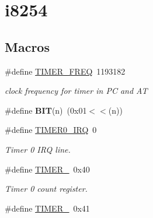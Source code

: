 \hypertarget{group__i8254}{\section{i8254}
\label{group__i8254}
}
\subsection*{Macros}
\begin{DoxyCompactItemize}
\item 
\hypertarget{group__i8254_gacf926951944b6cf370b7229ebd50dd8b}{\#define \hyperlink{group__i8254_gacf926951944b6cf370b7229ebd50dd8b}{T\-I\-M\-E\-R\-\_\-\-F\-R\-E\-Q}~1193182}\label{group__i8254_gacf926951944b6cf370b7229ebd50dd8b}

\begin{DoxyCompactList}\small\item\em clock frequency for timer in P\-C and A\-T \end{DoxyCompactList}\item 
\hypertarget{group__i8254_ga3a8ea58898cb58fc96013383d39f482c}{\#define {\bfseries B\-I\-T}(n)~(0x01$<$$<$(n))}\label{group__i8254_ga3a8ea58898cb58fc96013383d39f482c}

\item 
\hypertarget{group__i8254_ga30bf84c312af248cb81bb224e09f9ba8}{\#define \hyperlink{group__i8254_ga30bf84c312af248cb81bb224e09f9ba8}{T\-I\-M\-E\-R0\-\_\-\-I\-R\-Q}~0}\label{group__i8254_ga30bf84c312af248cb81bb224e09f9ba8}

\begin{DoxyCompactList}\small\item\em Timer 0 I\-R\-Q line. \end{DoxyCompactList}\item 
\hypertarget{group__i8254_gacc9ff9df4a9674a1ce9ba08fc4a4679e}{\#define \hyperlink{group__i8254_gacc9ff9df4a9674a1ce9ba08fc4a4679e}{T\-I\-M\-E\-R\-\_}~0x40}\label{group__i8254_gacc9ff9df4a9674a1ce9ba08fc4a4679e}

\begin{DoxyCompactList}\small\item\em Timer 0 count register. \end{DoxyCompactList}\item 
\hypertarget{group__i8254_gac62c99c2a9289891c1b83052242cca49}{\#define \hyperlink{group__i8254_gac62c99c2a9289891c1b83052242cca49}{T\-I\-M\-E\-R\-\_}~0x41}\label{group__i8254_gac62c99c2a9289891c1b83052242cca49}


\end{DoxyCompactItemize}
